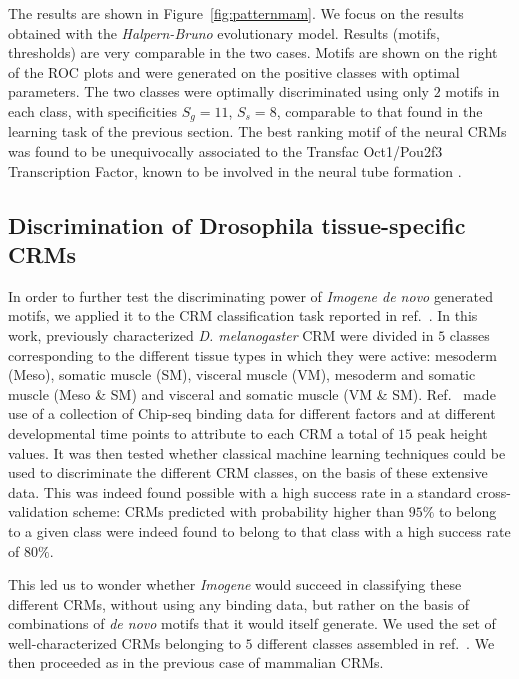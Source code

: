 \documentclass[a4,center,fleqn]{NAR}
\begin{document}
The results are shown in Figure~\ref{fig:patternmam}.
We focus on the results obtained with  the {\em Halpern-Bruno} evolutionary
model.
Results (motifs, thresholds) are very comparable in the two cases.
Motifs are shown on the right of the ROC plots and were generated on the
positive classes with optimal parameters.
%
The two classes were optimally discriminated using only $2$ motifs in each
class, with specificities $S_g=11$, $S_s=8$, comparable to that found in the
learning task of the previous section.
The best ranking motif of the neural CRMs was found to be unequivocally
associated to the Transfac Oct1/Pou2f3 Transcription Factor, known to be
involved in the neural tube formation \cite{Kiyota:2008fk}.

\subsection*{Discrimination of Drosophila tissue-specific CRMs}

In order to further test  the discriminating power of {\em Imogene de novo}
generated motifs, we applied it to the CRM classification task reported in
ref.~\cite{pmid19890324}.
In this work, previously characterized {\em D. melanogaster} CRM were divided
in $5$ classes corresponding to  the different tissue types in which they were
active: mesoderm (Meso), somatic muscle (SM), visceral muscle (VM), mesoderm
and somatic muscle (Meso \& SM) and visceral and somatic muscle (VM \& SM).
Ref.~\cite{pmid19890324} made use of a collection of  Chip-seq binding data for
different factors and at different developmental time points to attribute to
each CRM a total of $15$ peak height values.
It was then tested whether classical machine learning techniques could be used
to discriminate  the different CRM classes, on the basis of these extensive
data.
This was indeed found possible with a high success rate  in a standard
cross-validation scheme: CRMs predicted with probability higher than $95\%$ to
belong to a given class were indeed found to belong to that class with a high
success rate  of $80\%$.

This led us to wonder whether {\em Imogene} would succeed in classifying these
different CRMs,  without using any binding data, but rather on the basis of
combinations of {\it de novo}  motifs that it would itself generate. 
We used the  set of well-characterized  CRMs belonging to $5$ different classes
assembled in  ref.~\cite{pmid19890324}.
We then proceeded as in the previous case of mammalian CRMs.
    
\end{document}
